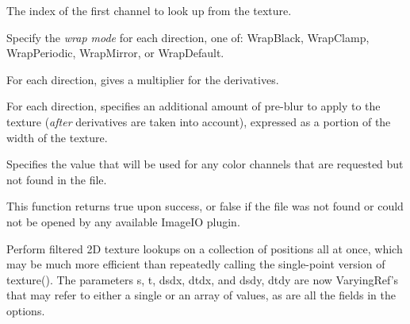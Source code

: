 \vspace{-24pt}
\vspace{10pt}
The index of the first channel to look up from the texture.
\apiend

\vspace{-24pt}
\vspace{10pt}
Specify the \emph{wrap mode} for each direction, one of: 
{\cf WrapBlack}, {\cf WrapClamp}, {\cf WrapPeriodic}, {\cf WrapMirror},
or {\cf WrapDefault}.
\apiend

\vspace{-24pt}
\vspace{10pt}
For each direction, gives a multiplier for the derivatives.
\apiend

\vspace{-24pt}
\vspace{10pt}
For each direction, specifies an additional amount of pre-blur to apply
to the texture (\emph{after} derivatives are taken into account),
expressed as a portion of the width of the texture.
\apiend

\vspace{-24pt}
\vspace{10pt}
Specifies the value that will be used for any color channels that are
requested but not found in the file.
\apiend

This function returns {\cf true} upon success, or {\cf false} if the
file was not found or could not be opened by any available ImageIO
plugin.
\apiend



Perform filtered 2D texture lookups on a collection of positions all at
once, which may be much more efficient than repeatedly calling the
single-point version of {\cf texture()}.  The parameters {\cf s},
{\cf t}, {\cf dsdx}, {\cf dtdx}, and {\cf dsdy}, {\cf dtdy} are now
{\cf VaryingRef}'s that may refer to either a single or an array of
values, as are all the fields in the {\cf options}.

